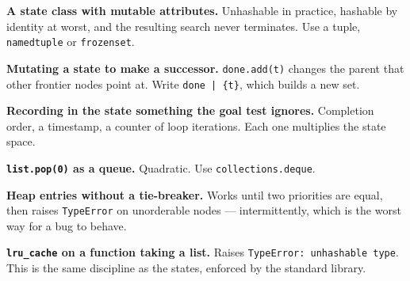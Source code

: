 \begin{pitfall}
\begin{tight}
  \item \textbf{A state class with mutable attributes.} Unhashable in practice,
        hashable by identity at worst, and the resulting search never terminates.
        Use a tuple, \texttt{namedtuple} or \texttt{frozenset}.
  \item \textbf{Mutating a state to make a successor.} \texttt{done.add(t)} changes
        the parent that other frontier nodes point at. Write
        \texttt{done | \{t\}}, which builds a new set.
  \item \textbf{Recording in the state something the goal test ignores.} Completion
        order, a timestamp, a counter of loop iterations. Each one multiplies the
        state space.
  \item \textbf{\texttt{list.pop(0)} as a queue.} Quadratic. Use
        \texttt{collections.deque}.
  \item \textbf{Heap entries without a tie-breaker.} Works until two priorities
        are equal, then raises \texttt{TypeError} on unorderable nodes ---
        intermittently, which is the worst way for a bug to behave.
  \item \textbf{\texttt{lru\_cache} on a function taking a list.} Raises
        \texttt{TypeError: unhashable type}. This is the same discipline as the
        states, enforced by the standard library.
\end{tight}
\end{pitfall}

